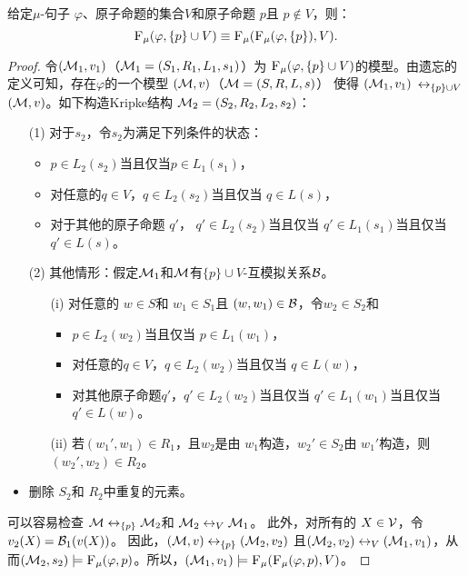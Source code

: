 \begin{proposition}[分解性]\label{chapter06:disTF}  给定$\mu$-句子 $\varphi$、原子命题的集合$V$和原子命题 $p$且 $p \notin V$，则：
	\[
	{\textsc{F}_{\textsc{$\mu$}}}(\varphi, \{p\} \cup V) \equiv {\textsc{F}_{\textsc{$\mu$}}}({\textsc{F}_{\textsc{$\mu$}}}(\varphi, \{p\}), V).
	\]
\end{proposition}
\begin{proof}
	令$({\cal M}_1,v_1)$（${\cal M}_1=(S_1, R_1, L_1, s_1)$）为 ${\textsc{F}_{\textsc{$\mu$}}}(\varphi, \{p\} \cup V)$的模型。由遗忘的定义可知，存在$\varphi$的一个模型 $({\cal M},v)$（${\cal M} = (S, R,L, s)$） 使得 $({\cal M}_1,v_1)$ $\leftrightarrow_{\{p\} \cup V}$ $({\cal M},v)$。如下构造Kripke结构 ${\cal M}_2 = (S_2, R_2, L_2, s_2)$：
	\begin{itemize}
		\item[(1)] 对于$s_2$，令$s_2$为满足下列条件的状态：
		\begin{itemize}
			\item $p \in L_2(s_2)$当且仅当$p \in L_1(s_1)$，
			\item 对任意的$q \in V$，$q \in L_2(s_2)$当且仅当 $q\in L(s)$，
			\item 对于其他的原子命题 $q'$， $q' \in L_2(s_2)$当且仅当 $q' \in L_1(s_1)$当且仅当 $q'\in L(s)$。
		\end{itemize}
		\item[(2)] 其他情形：假定${\cal M}_1$和${\cal M}$有$\{p\} \cup V$-互模拟关系${\cal B}$。
		\begin{itemize}
			\item[(i)] 对任意的 $w \in S$和 $w_1 \in S_1$且 $(w,w_1)\in {\cal B}$，令$w_2 \in S_2$和
			\begin{itemize}
				\item $p \in L_2(w_2)$当且仅当 $p \in L_1(w_1)$，
				\item 对任意的$q \in V$，$q \in L_2(w_2)$当且仅当 $q\in L(w)$，
				\item 对其他原子命题$q'$，$q' \in L_2(w_2)$当且仅当 $q' \in L_1(w_1)$当且仅当 $q'\in L(w)$。
			\end{itemize}
			\item[(ii)] 若$(w_1', w_1)\in R_1$，且$w_2$是由 $w_1$构造，$w_2'\in S_2$由 $w_1'$构造，则$(w_2', w_2)\in R_2$。
		\end{itemize}
		\item 删除 $S_2$和 $R_2$中重复的元素。
	\end{itemize}
	可以容易检查 ${\cal M} \leftrightarrow_{\{p\}} {\cal M}_2$和 ${\cal M}_2 \leftrightarrow_V {\cal M}_1$。
	此外，对所有的 $X \in {\cal V}$，令$v_2(X) = {\cal B}_1(v(X))$。
	因此，$({\cal M},v) \leftrightarrow_{\{p\}} ({\cal M}_2,v_2)$ 且$({\cal M}_2,v_2) \leftrightarrow_V ({\cal M}_1,v_1)$，从而$({\cal M}_2, s_2) \models {\textsc{F}_{\textsc{$\mu$}}}(\varphi, p)$。所以，$({\cal M}_1, v_1) \models {\textsc{F}_{\textsc{$\mu$}}}({\textsc{F}_{\textsc{$\mu$}}}(\varphi, p), V)$。
	

\end{proof}
